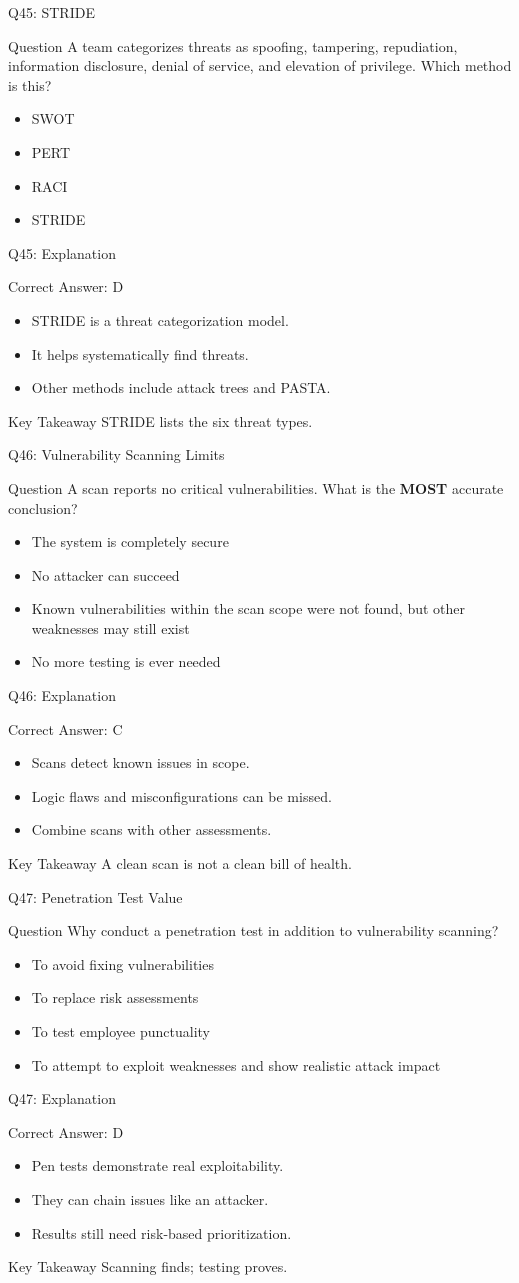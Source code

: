 \documentclass[aspectratio=169]{beamer}
\newcommand{\hq}[7]{%
	\begin{frame}{Q#1: #2}
		\begin{block}{Question}
			#3
		\end{block}
		\begin{itemize}
			#4
		\end{itemize}
	\end{frame}
	\begin{frame}{Q#1: Explanation}
		\begin{block}{Correct Answer: #5}
			\begin{itemize}
				#6
			\end{itemize}
		\end{block}
		\begin{alertblock}{Key Takeaway}
			#7
		\end{alertblock}
	\end{frame}
}
\begin{document}
	\hq{45}{STRIDE}
	{A team categorizes threats as spoofing, tampering, repudiation, information disclosure, denial of service, and elevation of privilege. Which method is this?}
	{\item[\textbf{(A)}] SWOT
		\item[\textbf{(B)}] PERT
		\item[\textbf{(C)}] RACI
		\item[\textbf{(D)}] STRIDE}
	{D}
	{\item STRIDE is a threat categorization model.
		\item It helps systematically find threats.
		\item Other methods include attack trees and PASTA.}
	{STRIDE lists the six threat types.}
	
	\hq{46}{Vulnerability Scanning Limits}
	{A scan reports no critical vulnerabilities. What is the \textbf{MOST} accurate conclusion?}
	{\item[\textbf{(A)}] The system is completely secure
		\item[\textbf{(B)}] No attacker can succeed
		\item[\textbf{(C)}] Known vulnerabilities within the scan scope were not found, but other weaknesses may still exist
		\item[\textbf{(D)}] No more testing is ever needed}
	{C}
	{\item Scans detect known issues in scope.
		\item Logic flaws and misconfigurations can be missed.
		\item Combine scans with other assessments.}
	{A clean scan is not a clean bill of health.}
	
	\hq{47}{Penetration Test Value}
	{Why conduct a penetration test in addition to vulnerability scanning?}
	{\item[\textbf{(A)}] To avoid fixing vulnerabilities
		\item[\textbf{(B)}] To replace risk assessments
		\item[\textbf{(C)}] To test employee punctuality
		\item[\textbf{(D)}] To attempt to exploit weaknesses and show realistic attack impact}
	{D}
	{\item Pen tests demonstrate real exploitability.
		\item They can chain issues like an attacker.
		\item Results still need risk-based prioritization.}
	{Scanning finds; testing proves.}
	
\end{document}

